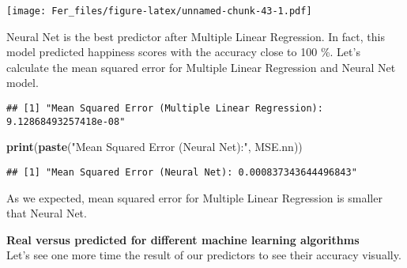 \documentclass[
]{article}
\newenvironment{Shaded}{\begin{snugshade}}{\end{snugshade}}
\newcommand{\DecValTok}[1]{\textcolor[rgb]{0.00,0.00,0.81}{#1}}
\newcommand{\FunctionTok}[1]{\textcolor[rgb]{0.13,0.29,0.53}{\textbf{#1}}}
\newcommand{\NormalTok}[1]{#1}
\newcommand{\OtherTok}[1]{\textcolor[rgb]{0.56,0.35,0.01}{#1}}
\newcommand{\SpecialCharTok}[1]{\textcolor[rgb]{0.81,0.36,0.00}{\textbf{#1}}}
\newcommand{\StringTok}[1]{\textcolor[rgb]{0.31,0.60,0.02}{#1}}
\begin{document}
\texttt{[image: Fer\_files/figure-latex/unnamed-chunk-43-1.pdf]}

Neural Net is the best predictor after Multiple Linear Regression. In
fact, this model predicted happiness scores with the accuracy close to
100 \%. Let's calculate the mean squared error for Multiple Linear
Regression and Neural Net model.

\begin{Shaded}
\end{Shaded}

\begin{verbatim}
## [1] "Mean Squared Error (Multiple Linear Regression): 9.12868493257418e-08"
\end{verbatim}

\begin{Shaded}
\begin{Highlighting}[]
\FunctionTok{print}\NormalTok{(}\FunctionTok{paste}\NormalTok{(}\StringTok{"Mean Squared Error (Neural Net):"}\NormalTok{, MSE.nn))}
\end{Highlighting}
\end{Shaded}

\begin{verbatim}
## [1] "Mean Squared Error (Neural Net): 0.000837343644496843"
\end{verbatim}

As we expected, mean squared error for Multiple Linear Regression is
smaller that Neural Net.

\textbf{Real versus predicted for different machine learning
algorithms}\\
Let's see one more time the result of our predictors to see their
accuracy visually.
\end{document}
